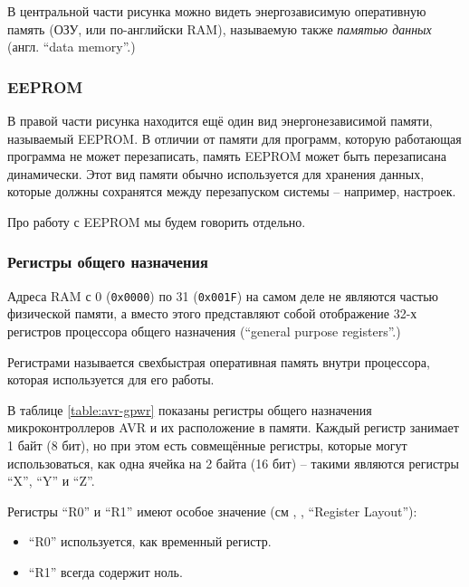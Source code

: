 \documentclass[../sparc.tex]{subfiles}
\begin{document}
В центральной части рисунка можно видеть энергозависимую оперативную память
(\gls{ОЗУ}, или по-английски \gls{RAM}), называемую также \emph{памятью данных}
(англ. ``data memory''.)

\subsubsection{EEPROM}

В правой части рисунка находится ещё один вид энергонезависимой памяти,
называемый \gls{EEPROM}.  В отличии от памяти для программ, которую работающая
программа не может перезаписать, память EEPROM может быть перезаписана
динамически.  Этот вид памяти обычно используется для хранения данных, которые
должны сохранятся между перезапуском системы -- например, настроек.

Про работу с EEPROM мы будем говорить отдельно.

\subsubsection{Регистры общего назначения}

Адреса \gls{RAM} с 0 (\texttt{0x0000}) по 31 (\texttt{0x001F})
на самом деле не являются частью физической памяти, а вместо этого представляют
собой отображение 32-х регистров процессора общего назначения (``general purpose
registers''.)

Регистрами называется свехбыстрая оперативная память внутри процессора, которая
используется для его работы.

В таблице \ref{table:avr-gpwr} показаны регистры общего назначения
микроконтроллеров AVR и их расположение в памяти.  Каждый регистр занимает 1
байт (8 бит), но при этом есть совмещённые регистры, которые могут
использоваться, как одна ячейка на 2 байта (16 бит) -- такими являются регистры
``X'', ``Y'' и ``Z''.

Регистры ``R0'' и ``R1'' имеют особое значение (см \cite{avr:gcc}, , ``Register
Layout''):
\begin{itemize}
\item ``R0'' используется, как временный регистр.
\item ``R1'' всегда содержит ноль.
\end{itemize}
\end{document}
